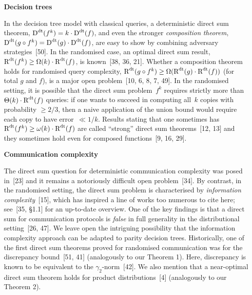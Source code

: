 \documentclass[10pt,a4paper]{article}
\begin{document}
\par\medskip\noindent\textbf{Decision trees}\par




In the decision tree model with classical queries, a deterministic direct sum theorem, ${\textup{D}}^{\textup{dt}}(f^{k})=k\cdot{\textup{D}}^{\textup{dt}}(f)$, and even the stronger \emph{composition theorem}, ${\textup{D}}^{\textup{dt}}(g\circ f^{k})={\textup{D}}^{\textup{dt}}(g)\cdot{\textup{D}}^{\textup{dt}}(f)$, are easy to show by combining adversary strategies [50]. In the randomised case, an optimal direct sum result, ${\textup{R}}^{\textup{dt}}(f^{k})\geq\Omega(k)\cdot{\textup{R}}^{\textup{dt}}(f)$, is known [38, 36, 21]. Whether a composition theorem holds for randomised query complexity, ${\textup{R}}^{\textup{dt}}(g\circ f^{k})\geq\Omega({\textup{R}}^{\textup{dt}}(g)\cdot{\textup{R}}^{\textup{dt}}(f))$ (for total $g$ and $f$), is a major open problem [10, 6, 8, 7, 49]. In the randomised setting, it is possible that the direct sum problem $f^{k}$ requires strictly more than $\Theta(k)\cdot{\textup{R}}^{\textup{dt}}(f)$ queries: if one wants to succeed in computing all $k$ copies with probability $\geq 2/3$, then a naive application of the union bound would require each copy to have error $\ll 1/k$. Results stating that one sometimes has ${\textup{R}}^{\textup{dt}}(f^{k})\geq\omega(k)\cdot{\textup{R}}^{\textup{dt}}(f)$ are called “strong” direct sum theorems [12, 13] and they sometimes hold even for composed functions [9, 16, 29].\par





\par\medskip\noindent\textbf{Communication complexity}\par




The direct sum question for deterministic communication complexity was posed in [23] and it remains a notoriously difficult open problem [34]. By contrast, in the randomised setting, the direct sum problem is characterised by \emph{information complexity} [15], which has inspired a line of works too numerous to cite here; see [35, §1.1] for an up-to-date overview. One of the key findings is that a direct sum for communication protocols is \emph{false} in full generality in the distributional setting [26, 47]. We leave open the intriguing possibility that the information complexity approach can be adapted to parity decision trees. Historically, one of the first direct sum theorems proved for randomised communication was for the discrepancy bound [51, 41] (analogously to our Theorem 1). Here, discrepancy is known to be equivalent to the $\gamma_{2}$-norm [42]. We also mention that a near-optimal direct sum theorem holds for product distributions [4] (analogously to our Theorem 2).\par
\end{document}
